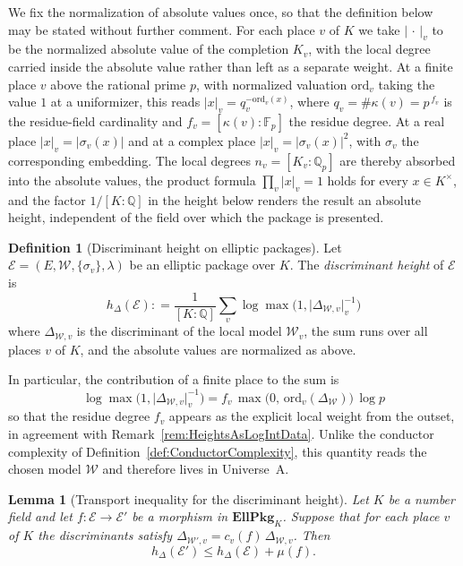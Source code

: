 \documentclass[10pt, reqno]{amsart}
\theoremstyle{plain}
\newtheorem{lemma}[theorem]{Lemma}
\theoremstyle{definition}
\newtheorem{definition}[theorem]{Definition}
\theoremstyle{plain}
\newcommand{\Q}{\mathbb{Q}}
\newcommand{\coloneqq}{\mathrel{\mathop:}=}
\begin{document}
We fix the normalization of absolute values once, so that the definition below may be stated without further comment. For each place $v$ of $K$ we take $\lvert\,\cdot\,\rvert_v$ to be the normalized absolute value of the completion $K_v$, with the local degree carried inside the absolute value rather than left as a separate weight. At a finite place $v$ above the rational prime $p$, with normalized valuation $\mathrm{ord}_v$ taking the value $1$ at a uniformizer, this reads $\lvert x\rvert_v = q_v^{-\mathrm{ord}_v(x)}$, where $q_v = \#\kappa(v) = p^{\,f_v}$ is the residue-field cardinality and $f_v = [\kappa(v):\mathbb{F}_p]$ the residue degree. At a real place $\lvert x\rvert_v = \lvert\sigma_v(x)\rvert$ and at a complex place $\lvert x\rvert_v = \lvert\sigma_v(x)\rvert^{2}$, with $\sigma_v$ the corresponding embedding. The local degrees $n_v = [K_v:\Q_p]$ are thereby absorbed into the absolute values, the product formula $\prod_v \lvert x\rvert_v = 1$ holds for every $x\in K^\times$, and the factor $1/[K:\Q]$ in the height below renders the result an absolute height, independent of the field over which the package is presented.

\begin{definition}[Discriminant height on elliptic packages]\label{def:DiscriminantHeight}
Let $\mathcal{E} = (E, \mathcal{W}, \{\sigma_v\}, \lambda)$ be an elliptic package over $K$. The \emph{discriminant height} of $\mathcal{E}$ is
\[
h_\Delta(\mathcal{E}) \coloneqq \frac{1}{[K:\Q]} \sum_{v} \log \max\bigl(1, \lvert \Delta_{\mathcal{W},v} \rvert_v^{-1}\bigr)
\]
where $\Delta_{\mathcal{W},v}$ is the discriminant of the local model $\mathcal{W}_v$, the sum runs over all places $v$ of $K$, and the absolute values are normalized as above.
\end{definition}

In particular, the contribution of a finite place to the sum is
\[
  \log \max\bigl(1, \lvert \Delta_{\mathcal{W},v}\rvert_v^{-1}\bigr)
  = f_v \, \max\bigl(0,\, \mathrm{ord}_v(\Delta_{\mathcal{W}})\bigr)\,\log p
\]
so that the residue degree $f_v$ appears as the explicit local weight from the outset, in agreement with Remark~\ref{rem:HeightsAsLogIntData}. Unlike the conductor complexity of Definition~\ref{def:ConductorComplexity}, this quantity reads the chosen model $\mathcal{W}$ and therefore lives in Universe~A.

\begin{lemma}[Transport inequality for the discriminant height]\label{lem:TransportDiscriminant}
Let $K$ be a number field and let $f \colon \mathcal{E} \to \mathcal{E}'$ be a morphism in $\mathbf{EllPkg}_K$. Suppose that for each place $v$ of $K$ the discriminants satisfy $\Delta_{\mathcal{W}',v} = c_v(f)\,\Delta_{\mathcal{W},v}$. Then
\[
  h_\Delta(\mathcal{E}')
  \le
  h_\Delta(\mathcal{E}) + \mu(f).
\]
\end{lemma}
\end{document}

